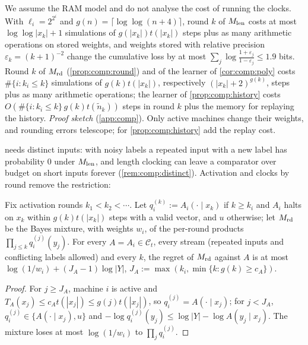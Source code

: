 \begin{remark}\label{rem:comp:runtime}
We assume the RAM model and do not analyse the cost of running the clocks. With $\ell_i=2^{2^i}$ and $g(n)=\lceil\log\log(n+4)\rceil$, round $k$ of $M_{\mathrm{len}}$ costs at most $\log\log|x_k|+1$ simulations of $g(|x_k|)t(|x_k|)$ steps plus as many arithmetic operations on stored weights, and weights stored with relative precision $\varepsilon_k=(k+1)^{-2}$ change the cumulative loss by at most $\sum_j\log\frac{1+\varepsilon_j}{1-\varepsilon_j}\le1.9$ bits. Round $k$ of $M_{\mathrm{rd}}$ (\cref{prop:comp:round}) and of the learner of \cref{cor:comp:poly} costs $\#\{i:k_i\le k\}$ simulations of $g(k)t(|x_k|)$, respectively $(|x_k|+2)^{g(k)}$, steps plus as many arithmetic operations; the learner of \cref{prop:comp:history} costs $O(\#\{i:k_i\le k\}\,g(k)t(\tilde n_k))$ steps in round $k$ plus the memory for replaying the history. \emph{Proof sketch} (\cref{app:comp}). Only active machines change their weights, and rounding errors telescope; for \cref{prop:comp:history} add the replay cost.
\end{remark}

 needs distinct inputs: with noisy labels a repeated input with a new label has probability $0$ under $M_{\mathrm{len}}$, and length clocking can leave a comparator over budget on short inputs forever (\cref{rem:comp:distinct}). Activation and clocks by round remove the restriction:

\begin{proposition}\label{prop:comp:round}
Fix activation rounds $k_1<k_2<\cdots$. Let $q_i^{(k)}:=A_i(\cdot\mid x_k)$ if $k\ge k_i$ and $A_i$ halts on $x_k$ within $g(k)t(|x_k|)$ steps with a valid vector, and $u$ otherwise; let $M_{\mathrm{rd}}$ be the Bayes mixture, with weights $w_i$, of the per-round products $\prod_{j\le k}q_i^{(j)}(y_j)$. For every $A=A_i\in\mathcal C_t$, every stream (repeated inputs and conflicting labels allowed) and every $k$, the regret of $M_{\mathrm{rd}}$ against $A$ is at most $\log(1/w_i)+(J_A-1)\log|Y|$, $J_A:=\max(k_i,\min\{k:g(k)\ge c_A\})$.
\end{proposition}

\begin{proof}
For $j\ge J_A$, machine $i$ is active and $T_A(x_j)\le c_At(|x_j|)\le g(j)t(|x_j|)$, so $q_i^{(j)}=A(\cdot\mid x_j)$; for $j<J_A$, $q_i^{(j)}\in\{A(\cdot\mid x_j),u\}$ and $-\log q_i^{(j)}(y_j)\le\log|Y|-\log A(y_j\mid x_j)$. The mixture loses at most $\log(1/w_i)$ to $\prod_jq_i^{(j)}$.
\end{proof}

